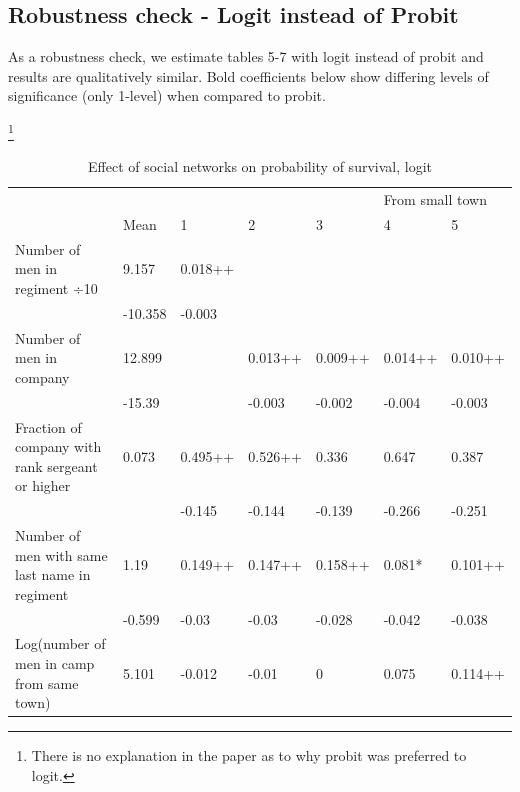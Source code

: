 \documentclass{article}
\begin{document}
\subsection{Robustness check - Logit instead of Probit}

As a robustness check, we estimate tables 5-7 with logit instead of probit and results are qualitatively similar. Bold coefficients below show differing levels of significance (only 1-level) when compared to probit.

\begin{table}
\caption{Effect of social networks on probability of survival, logit}\footnote{There is no explanation in the paper as to why probit was preferred to logit.}
\label{logit}
\begin{tabular}{lllllll}
\hline
                                                 &         &         &         &         & \multicolumn{2}{l}{From small town} \\
                                                 & Mean    & 1       & 2       & 3       & 4                                   & 5 \\
Number of men in regiment ÷10                    & 9.157   & 0.018++ &         &         &                                     &  \\
                                                 & -10.358 & -0.003  &         &         &                                     &  \\
Number of men in company                         & 12.899  &         & 0.013++ & 0.009++ & 0.014++                             & 0.010++ \\
                                                 & -15.39  &         & -0.003  & -0.002  & -0.004                              & -0.003 \\
Fraction of company with rank sergeant or higher & 0.073   & 0.495++ & 0.526++ & 0.336   & 0.647                               & 0.387 \\
                                                 &         & -0.145  & -0.144  & -0.139  & -0.266                              & -0.251 \\
Number of men with same last name in regiment    & 1.19    & 0.149++ & 0.147++ & 0.158++ & 0.081*                              & 0.101++ \\
                                                 & -0.599  & -0.03   & -0.03   & -0.028  & -0.042                              & -0.038 \\
Log(number of men in camp from same town)        & 5.101   & -0.012  & -0.01   & 0       & 0.075                               & 0.114++ \\

\end{tabular}
\end{table}
\end{document}
